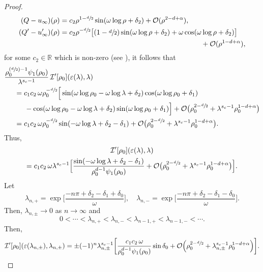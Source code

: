 \documentclass[JEP,XML,SOM,Unicode]{cedram}
\newcommand{\Psfrac}[2]{(\sfrac{#1}{#2})}
\theoremstyle{plain}
\theoremstyle{definition}
\begin{document}
\begin{proof}
\begin{equation}
\label{eq: Asymptote of Q}
\begin{aligned}
(Q-u_\infty )(\rho)&=c_2 \rho^{1-\sfrac{d}{2}}\sin (\omega\log \rho+\delta_2)+\mathcal O(\rho^{2-d+\alpha}),\\
(Q'-u_\infty ')(\rho)&=c_2 \rho^{-\sfrac{d}{2}}\big[(1-\sfrac{d}{2})\sin(\omega\log\rho+\delta_2)+\omega\cos (\omega\log\rho+\delta_2)\big]\\
&\hspace*{7cm}+\mathcal O(\rho^{1-d+\alpha}),
\end{aligned}
\end{equation}
for some $c_2\in\mathbb R$ which is non-zero (see \cite{L}), it follows that
\[
\begin{aligned}
&\frac{\rho_0^{\Psfrac{d}{2}-1}\psi_1(\rho_0)}{\lambda^{s_c-1}}\,\mathcal I'[\rho_0](\varepsilon(\lambda),\lambda)\\
&\hspace*{.5cm}=c_1c_2\,\omega \rho_0^{-\sfrac{d}{2}}\Big[\sin(\omega\log \rho_0-\omega\log\lambda +\delta_2)\cos(\omega\log\rho_0+\delta_1)\\
&\hspace*{1cm}-\cos(\omega\log\rho_0-\omega\log\lambda+\delta_2)\sin (\omega\log\rho_0+\delta_1)\Big]+\mathcal O\big(\rho_0^{2-\sfrac{d}{2}}+\lambda^{s_c-1}\rho_0^{1-d+\alpha}\big)\\
&\hspace*{.5cm}=c_1c_2\,\omega \rho_0^{-\sfrac{d}{2}}\sin(-\omega\log\lambda+\delta_2-\delta_1)+\mathcal O\big(\rho_0^{2-\sfrac{d}{2}}+\lambda^{s_c-1}\rho_0^{1-d+\alpha}\big).
\end{aligned}
\]
Thus,
\begin{multline}
\mathcal I'[\rho_0](\varepsilon(\lambda),\lambda)\\
=c_1c_2\,\omega\lambda^{s_c-1}\Big[\frac{\sin(-\omega\log\lambda+\delta_2-\delta_1)}{\rho_0^{d-1}\psi_1(\rho_0)}+\mathcal O\big(\rho_0^{2-\sfrac{d}{2}}+\lambda^{s_c-1}\rho_0^{1-d+\alpha}\big)\Big].
\end{multline}
Let
\begin{equation}
\label{eq:definitionoflambdakpm}
\lambda_{n,+}=\exp \Big[\frac{-n\pi+\delta_2-\delta_1+\delta_0}{\omega} \Big],\quad \lambda_{n,-}=\exp \Big[\frac{-n\pi+\delta_2-\delta_1-\delta_0}{\omega} \Big].
\end{equation}
Then, $\lambda_{n,\pm}\to 0$ as $n\to\infty$ and
\[
0<\cdots <\lambda_{n,+}<\lambda_{n,-}<\lambda_{n-1,+}<\lambda_{n-1,-}<\cdots.
\]
Then,
\[
\mathcal I'[\rho_0](\varepsilon(\lambda_{n,\pm}),\lambda_{n,\pm})= \pm(-1)^n \lambda_{n,\pm}^{s_c-1}\bigg[\frac{c_1c_2\,\omega}{\rho_0^{d-1}\psi_1(\rho_0)}\sin \delta_0+\mathcal O\Big(\rho_0^{2-\sfrac{d}{2}}+\lambda_{n,\pm}^{s_c-1}\rho_0^{1-d+\alpha}\Big)\bigg].
\]
\end{proof}
\end{document}
